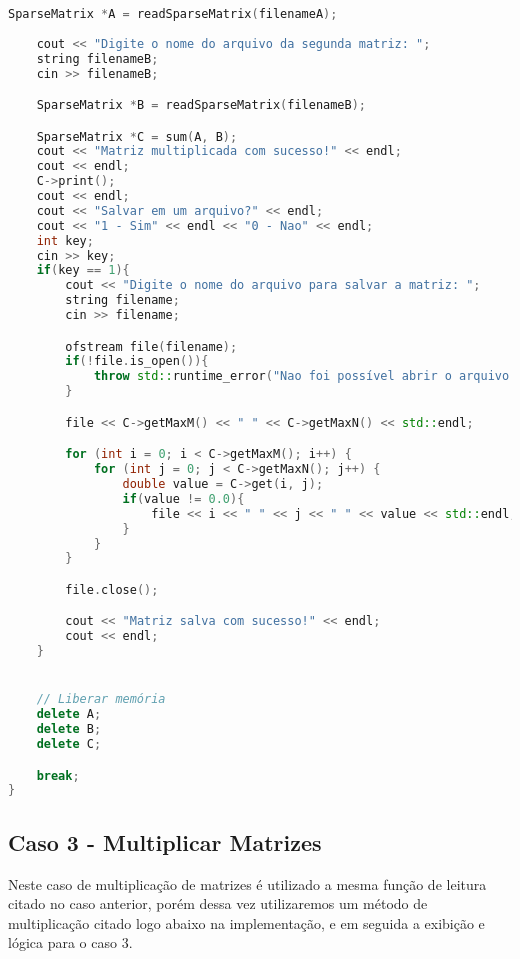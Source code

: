 \documentclass[a4paper,12pt]{article}
\begin{document}
\begin{lstlisting}[language=C++]
    SparseMatrix *A = readSparseMatrix(filenameA);
    
    cout << "Digite o nome do arquivo da segunda matriz: ";
    string filenameB;
    cin >> filenameB;

    SparseMatrix *B = readSparseMatrix(filenameB);

    SparseMatrix *C = sum(A, B);
    cout << "Matriz multiplicada com sucesso!" << endl;
    cout << endl;
    C->print();
    cout << endl;
    cout << "Salvar em um arquivo?" << endl;
    cout << "1 - Sim" << endl << "0 - Nao" << endl;
    int key;
    cin >> key;
    if(key == 1){
        cout << "Digite o nome do arquivo para salvar a matriz: ";
        string filename;
        cin >> filename;

        ofstream file(filename);
        if(!file.is_open()){
            throw std::runtime_error("Nao foi possível abrir o arquivo: " + filename);
        }

        file << C->getMaxM() << " " << C->getMaxN() << std::endl;

        for (int i = 0; i < C->getMaxM(); i++) {
            for (int j = 0; j < C->getMaxN(); j++) {
                double value = C->get(i, j);
                if(value != 0.0){
                    file << i << " " << j << " " << value << std::endl;
                }
            }
        }

        file.close();

        cout << "Matriz salva com sucesso!" << endl;
        cout << endl;
    }


    // Liberar memória
    delete A;
    delete B;
    delete C;

    break;
}
\end{lstlisting}

\subsection{Caso 3 - Multiplicar Matrizes}

Neste caso de multiplicação de matrizes é utilizado a mesma função de leitura citado no caso anterior, porém dessa vez utilizaremos um método de multiplicação citado logo abaixo na implementação, e em seguida a exibição e lógica para o caso 3.
\end{document}
